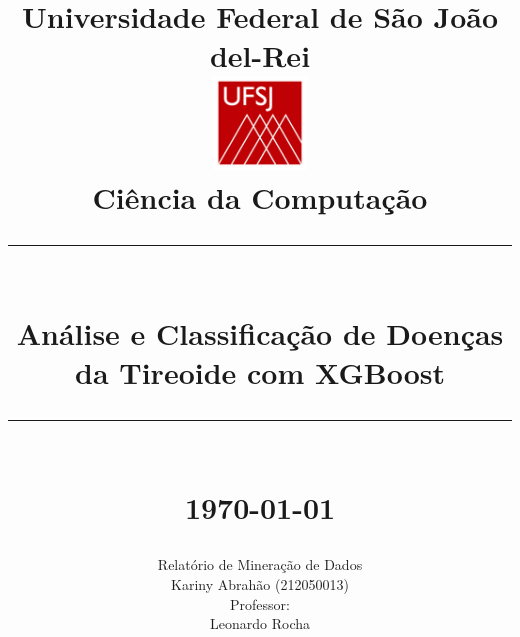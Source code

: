 \documentclass[11pt]{article}
\newcommand{\HRule}[1]{\rule{\linewidth}{#1}}
\begin{document}
\date{}

\title{ \normalsize Universidade Federal de São João del-Rei
		\\ [1.0cm]
		\includegraphics[width=25mm]{img/ufsjbr_logo.jpg}  \\[.5cm]
		\normalsize Ciência da Computação \\ [3.5cm]
		\HRule{2pt} \\
		\LARGE \textbf{Análise e Classificação de Doenças da Tireoide com XGBoost} %
		\HRule{2pt} \\ [0.5cm]
		\normalsize \today \vspace*{5\baselineskip}}
		
\date{}

\author{
        Relatório de Mineração de Dados \\[0.5cm]
		Kariny Abrahão (212050013)            \\[1cm]
		 Professor:        \\
		 Leonardo Rocha
		 }
		 
\maketitle

\newpage

\tableofcontents



\end{document}
